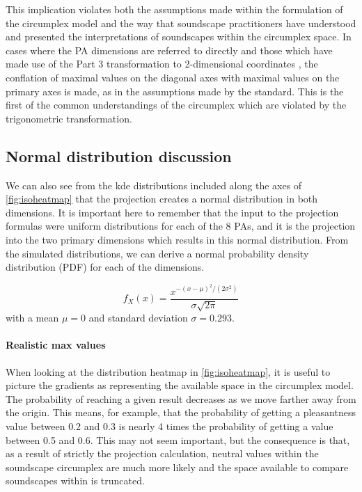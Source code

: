 This implication violates both the assumptions made within the formulation of the circumplex model and the way that soundscape practitioners have understood and presented the interpretations of soundscapes within the circumplex space. In cases where the PA dimensions are referred to directly \citep{Steele2016Evaluation, Steele2019Soundtracking} and those which have made use of the Part 3 transformation to 2-dimensional coordinates \citep{Mancini2021Soundwalk, Lionello2021Introducing, Manzano2021importance}, the conflation of maximal values on the diagonal axes with maximal values on the primary axes is made, as in the assumptions made by the standard. This is the first of the common understandings of the circumplex which are violated by the trigonometric transformation.

\subsection{Normal distribution discussion}
We can also see from the kde distributions included along the axes of \cref{fig:isoheatmap} that the projection creates a normal distribution in both dimensions. It is important here to remember that the input to the projection formulas were uniform distributions for each of the 8 PAs, and it is the projection into the two primary dimensions which results in this normal distribution. From the simulated distributions, we can derive a normal probability density distribution (PDF) for each of the dimensions.

\[   f_X(x) = \frac{x^{-(x-\mu)^2/(2\sigma^2)}}{\sigma \sqrt{2\pi}}\]
with a mean $\mu = 0$ and standard deviation $\sigma = 0.293$.

\paragraph*{Realistic max values}
When looking at the distribution heatmap in \cref{fig:isoheatmap}, it is useful to picture the gradients as representing the available space in the circumplex model. The probability of reaching a given result decreases as we move farther away from the origin. This means, for example, that the probability of getting a pleasantness value between 0.2 and 0.3 is nearly 4 times the probability of getting a value between 0.5 and 0.6. This may not seem important, but the consequence is that, as a result of strictly the projection calculation, neutral values within the soundscape circumplex are much more likely and the space available to compare soundscapes within is truncated.

